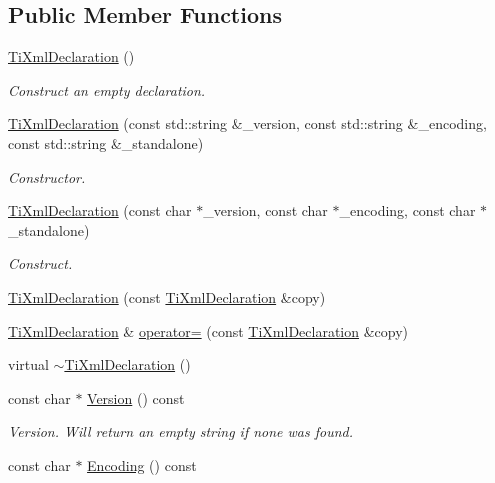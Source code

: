 \subsection*{Public Member Functions}
\begin{DoxyCompactItemize}
\item 
\hyperlink{class_ti_xml_declaration_aa0484d059bea0ea1acb47c9094382d79}{Ti\-Xml\-Declaration} ()
\begin{DoxyCompactList}\small\item\em Construct an empty declaration. \end{DoxyCompactList}\item 
\hyperlink{class_ti_xml_declaration_acd5556007c3c72209465081de39d9836}{Ti\-Xml\-Declaration} (const std\-::string \&\-\_\-version, const std\-::string \&\-\_\-encoding, const std\-::string \&\-\_\-standalone)
\begin{DoxyCompactList}\small\item\em Constructor. \end{DoxyCompactList}\item 
\hyperlink{class_ti_xml_declaration_a3b618d1c30c25e4b7a71f31a595ee298}{Ti\-Xml\-Declaration} (const char $\ast$\-\_\-version, const char $\ast$\-\_\-encoding, const char $\ast$\-\_\-standalone)
\begin{DoxyCompactList}\small\item\em Construct. \end{DoxyCompactList}\item 
\hyperlink{class_ti_xml_declaration_a58ac9042c342f7845c8491da0bb091e8}{Ti\-Xml\-Declaration} (const \hyperlink{class_ti_xml_declaration}{Ti\-Xml\-Declaration} \&copy)
\item 
\hyperlink{class_ti_xml_declaration}{Ti\-Xml\-Declaration} \& \hyperlink{class_ti_xml_declaration_a3bc617efe11014ff2b1a9c5727c37a9a}{operator=} (const \hyperlink{class_ti_xml_declaration}{Ti\-Xml\-Declaration} \&copy)
\item 
virtual \hyperlink{class_ti_xml_declaration_ad5f37a673f4c507fd7e550470f9cec25}{$\sim$\-Ti\-Xml\-Declaration} ()
\item 
const char $\ast$ \hyperlink{class_ti_xml_declaration_a02ee557b1a4545c3219ed377c103ec76}{Version} () const 
\begin{DoxyCompactList}\small\item\em Version. Will return an empty string if none was found. \end{DoxyCompactList}\item 
const char $\ast$ \hyperlink{class_ti_xml_declaration_a5d974231f9e9a2f0542f15f3a46cdb76}{Encoding} () const 

\end{DoxyCompactItemize}
